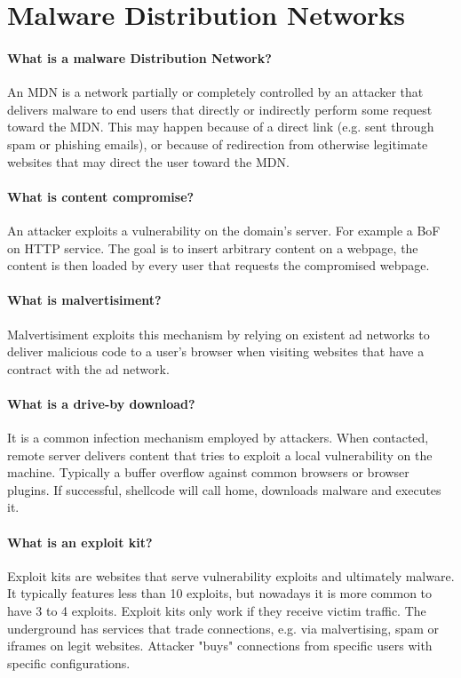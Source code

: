 \section{Malware Distribution Networks}
\paragraph{What is a malware Distribution Network?}
An MDN is a network partially or completely controlled by an attacker that delivers malware to end users that directly or indirectly perform some request toward the MDN. This may happen because of a direct link (e.g. sent through spam or phishing emails), or because of redirection from otherwise legitimate websites that may direct the user toward the MDN.

\paragraph{What is content compromise?}
An attacker exploits a vulnerability on the domain's server. For example a BoF on HTTP service. The goal is to insert arbitrary content on a webpage, the content is then loaded by every user that requests the compromised webpage.

\paragraph{What is malvertisiment?}
Malvertisiment exploits this mechanism by relying on existent ad networks to deliver malicious code to a user's browser when visiting websites that have a contract with the ad network.

\paragraph{What is a drive-by download?}
It is a common infection mechanism employed by attackers. When contacted, remote server delivers content that tries to exploit a local vulnerability on the machine. Typically a buffer overflow against common browsers or browser plugins. If successful, shellcode will call home, downloads malware and executes it.

\paragraph{What is an exploit kit?}
Exploit kits are websites that serve vulnerability exploits and ultimately malware. It typically features less than 10 exploits, but nowadays it is more common to have 3 to 4 exploits. Exploit kits only work if they receive victim traffic. The underground has services that trade connections, e.g. via malvertising, spam or iframes on legit websites. Attacker "buys" connections from specific users with specific configurations.

